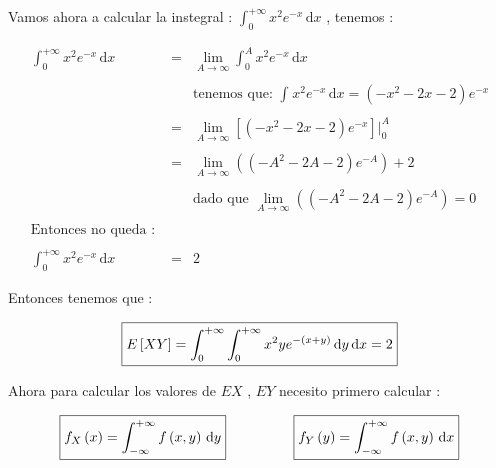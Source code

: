 \documentclass[12pt]{article}
\begin{document}
    \begin{flushleft}
        Vamos ahora a calcular la instegral : $\displaystyle \int_{0}^{+\infty} x^2e^{-x}  \,\mathrm{d}x$ , tenemos : 
    \end{flushleft}

    \begin{equation*}
        \begin{array}{rcl}
            \displaystyle \int_{0}^{+\infty} x^2e^{-x}  \,\mathrm{d}x & = & \displaystyle \lim_{A \to \infty} \int_{0}^{A} x^2e^{-x}  \,\mathrm{d}x  
            \\
            \\
            && \mbox{tenemos que: $\displaystyle \int_{}^{} x^2e^{-x}  \,\mathrm{d}x = \left(-x^2 -2x -2 \right)e^{-x}$}
            \\
            \\
            & = &\displaystyle \lim_{A \to \infty}  \left[\left(-x^2 -2x -2 \right)e^{-x}\right] \vert_{0}^{A}
            \\
            \\
            & = &\displaystyle  \lim_{A \to \infty}  \left(\left(-A^2 -2A -2 \right)e^{-A}\right) + 2 
            \\
            \\
            && \mbox{dado que $\displaystyle  \lim_{A \to \infty}  \left(\left(-A^2 -2A -2 \right)e^{-A}\right) = 0  $}
            \\
            \\
            \mbox{Entonces no queda : } &&
            \\
            \\
            \displaystyle \int_{0}^{+\infty} x^2e^{-x}  \,\mathrm{d}x  & = & 2 
        \end{array}
    \end{equation*}

    \begin{flushleft}
        Entonces tenemos que : 
    \end{flushleft}

    \begin{equation*}
        \fbox{$
            E\left[XY\right] = \displaystyle \int_{0}^{+\infty} \int_{0}^{+\infty} x^2ye^{-\left(x+y\right)} \,\mathrm{d}y  \,\mathrm{d}x = 2
        $}
    \end{equation*}

    \vspace{1cm}

    \begin{flushleft}
        Ahora para calcular los valores de $EX$ , $EY$ necesito primero calcular :
    \end{flushleft}

    \begin{equation*}
        \begin{array}{cp{1cm}c}
            \fbox{$
            f_X\left(x\right) =\displaystyle  \int_{-\infty}^{+\infty} f\left(x,y\right) \,\mathrm{d}y
            $}
            &
            &
            \fbox{$
            f_Y\left(y\right) =\displaystyle  \int_{-\infty}^{+\infty} f\left(x,y\right) \,\mathrm{d}x
            $}
        \end{array}
    \end{equation*}
\end{document}
